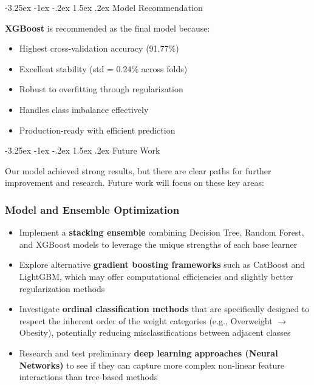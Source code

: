 \documentclass[12pt,a4paper]{article}
\makeatletter
\renewcommand{\subsection}{\@startsection{subsection}{2}{\z@}%
                                   {-3.25ex \@plus -1ex \@minus -.2ex}%
                                   {1.5ex \@plus .2ex}%
                                   {\normalfont\large\bfseries\vspace{0.3\baselineskip}}}
\makeatother
\begin{document}
\subsection{Model Recommendation}

\textbf{XGBoost} is recommended as the final model because:
\begin{itemize}
    \item Highest cross-validation accuracy (91.77\%)
    \item Excellent stability (std = 0.24\% across folds)
    \item Robust to overfitting through regularization
    \item Handles class imbalance effectively
    \item Production-ready with efficient prediction
\end{itemize}
\newpage
\subsection{Future Work}

Our model achieved strong results, but there are clear paths for further improvement and research. Future work will focus on these key areas:

\subsubsection{Model and Ensemble Optimization}
\begin{itemize}
    \item Implement a \textbf{stacking ensemble} combining Decision Tree, Random Forest, and XGBoost models to leverage the unique strengths of each base learner
    \item Explore alternative \textbf{gradient boosting frameworks} such as CatBoost and LightGBM, which may offer computational efficiencies and slightly better regularization methods
    \item Investigate \textbf{ordinal classification methods} that are specifically designed to respect the inherent order of the weight categories (e.g., Overweight $\rightarrow$ Obesity), potentially reducing misclassifications between adjacent classes
    \item Research and test preliminary \textbf{deep learning approaches (Neural Networks)} to see if they can capture more complex non-linear feature interactions than tree-based methods
\end{itemize}
\end{document}
